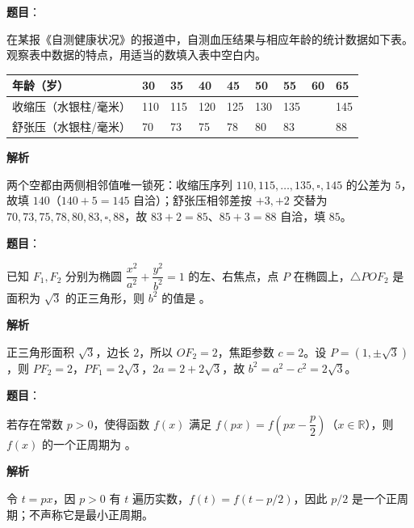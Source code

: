 \begin{answer}

\textbf{题目}：

在某报《自测健康状况》的报道中，自测血压结果与相应年龄的统计数据如下表。观察表中数据的特点，用适当的数填入表中空白内。

\begin{center}
\begingroup\setlength{\tabcolsep}{4pt}
\begin{tabular}{lllllllll}
\toprule
年龄（岁） & 30 & 35 & 40 & 45 & 50 & 55 & 60 & 65 \\
\midrule
收缩压（水银柱/毫米） & 110 & 115 & 120 & 125 & 130 & 135 &  & 145 \\
舒张压（水银柱/毫米） & 70 & 73 & 75 & 78 & 80 & 83 &  & 88 \\
\bottomrule
\end{tabular}
\endgroup
\end{center}

\textbf{解析}

两个空都由两侧相邻值唯一锁死：收缩压序列 $110,115,\dots,135,\square,145$ 的公差为 $5$，故填 $140$（$140+5=145$ 自洽）；舒张压相邻差按 $+3,+2$ 交替为 $70,73,75,78,80,83,\square,88$，故 $83+2=85$、$85+3=88$ 自洽，填 $85$。


\end{answer}
\begin{answer}

\textbf{题目}：

已知 $F_1,F_2$ 分别为椭圆 $\dfrac{x^2}{a^2}+\dfrac{y^2}{b^2}=1$ 的左、右焦点，点 $P$ 在椭圆上，$\triangle POF_2$ 是面积为 $\sqrt3$ 的正三角形，则 $b^2$ 的值是 \gkblank{}。

\textbf{解析}

正三角形面积 $\sqrt3$，边长 $2$，所以 $OF_2=2$，焦距参数 $c=2$。设 $P=(1,\pm\sqrt3)$，则 $PF_2=2$，$PF_1=2\sqrt3$，$2a=2+2\sqrt3$，故 $b^2=a^2-c^2=2\sqrt3$。


\end{answer}
\begin{answer}

\textbf{题目}：

若存在常数 $p>0$，使得函数 $f(x)$ 满足 $f(px)=f(px-\dfrac p2)$（$x\in\mathbb R$），则 $f(x)$ 的一个正周期为 \gkblank{}。

\textbf{解析}

令 $t=px$，因 $p>0$ 有 $t$ 遍历实数，$f(t)=f(t-p/2)$，因此 $p/2$ 是一个正周期；不声称它是最小正周期。


\end{answer}
